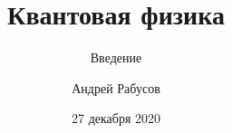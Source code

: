 \documentclass[t,aspectratio=169]{beamer}
\author[А. Рабусов]{Андрей Рабусов}
\title[Квантовая физика]{Квантовая физика}
\subtitle{Введение}
\date{27 декабря 2020}
\begin{document}
\begin{frame}
    \maketitle
\end{frame}

\end{document}
